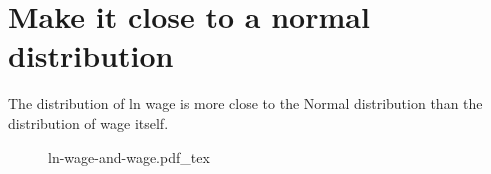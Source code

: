 \documentclass[12pt]{article}
\title{}
\author{}
\date{}
\newcommand{\incfig}[1]{%
\def\svgwidth{\columnwidth}
{#1.pdf_tex}
}
\begin{document}
\section{Make it close to a normal distribution}
The distribution of ln wage is more close to the Normal distribution than the 
distribution of wage itself.

\begin{figure}[ht]
    \centering
    \incfig{ln-wage-and-wage}
    \label{fig:ln-wage-and-wage}
\end{figure}







\end{document}
